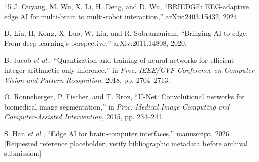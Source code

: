 \documentclass[11pt]{article}
\begin{document}
\begin{thebibliography}{15}
J. Ouyang, M. Wu, X. Li, H. Deng, and D. Wu, ``BRIEDGE: EEG-adaptive edge AI for multi-brain to multi-robot interaction,'' arXiv:2403.15432, 2024.

D. Liu, H. Kong, X. Luo, W. Liu, and R. Subramaniam, ``Bringing AI to edge: From deep learning's perspective,'' arXiv:2011.14808, 2020.

B. Jacob \emph{et al.}, ``Quantization and training of neural networks for efficient integer-arithmetic-only inference,'' in \emph{Proc. IEEE/CVF Conference on Computer Vision and Pattern Recognition}, 2018, pp. 2704--2713.

O. Ronneberger, P. Fischer, and T. Brox, ``U-Net: Convolutional networks for biomedical image segmentation,'' in \emph{Proc. Medical Image Computing and Computer-Assisted Intervention}, 2015, pp. 234--241.

S. Han \emph{et al.}, ``Edge AI for brain-computer interfaces,'' manuscript, 2026. [Requested reference placeholder; verify bibliographic metadata before archival submission.]

\end{thebibliography}
\end{document}
